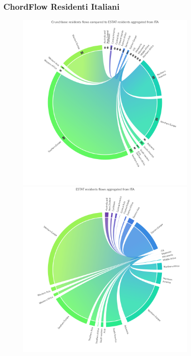 \subsubsection{ChordFlow Residenti Italiani}
\begin{figure}[t]
    \centering
    \includegraphics[width=0.8\textwidth]{images/ChordFlows/filtered_nationality/ita/Crunchbase_res_ESTAT_True.png}
    \includegraphics[width=0.8\textwidth]{images/ChordFlows/filtered_nationality/ita/ESTAT_res_True.png}
    \label{fig:chordita_res_true}
\end{figure}

